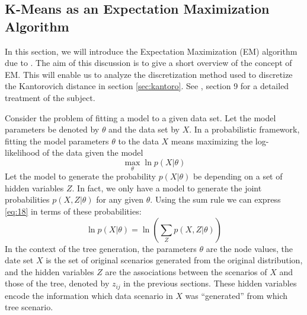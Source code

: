 \subsection{K-Means as an Expectation Maximization Algorithm}
\label{sec:k-means-as-EM}
In this section, we will introduce the Expectation Maximization (EM) algorithm due to \cite{Dempster1977}.
The aim of this discussion is to give a short overview of the concept of EM.
This will enable us to analyze the discretization method used to discretize the Kantorovich distance in section \ref{sec:kantoro}.
See \cite{Bishop2006}, section 9 for a detailed treatment of the subject.

Consider the problem of fitting a model to a given data set.
Let the model parameters be denoted by $\theta$ and the data set by $X$.
In a probabilistic framework, fitting the model parameters $\theta$ to the data $X$ means maximizing the log-likelihood of the data given the model
\begin{equation}
  \label{eq:18}
  \max\limits_\theta \ln p(X|\theta)
\end{equation}
Let the model to generate the probability $p(X|\theta)$ be depending on a set of hidden variables $Z$.
In fact, we only have a model to generate the joint probabilities $p(X,Z|\theta)$ for any given $\theta$.
Using the sum rule we can express \eqref{eq:18} in terms of these probabilities:
\begin{equation}
  \label{eq:19}
  \ln p(X|\theta) = \ln\left(\sum_Zp(X,Z|\theta)\right)
\end{equation}
In the context of the tree generation, the parameters $\theta$ are the node values, the date set $X$ is the set of original scenarios generated from the original distribution, and the hidden variables $Z$ are the associations between the scenarios of $X$ and those of the tree, denoted by $z_{ij}$ in the previous sections.
These hidden variables encode the information which data scenario in $X$ was ``generated'' from which tree scenario.

